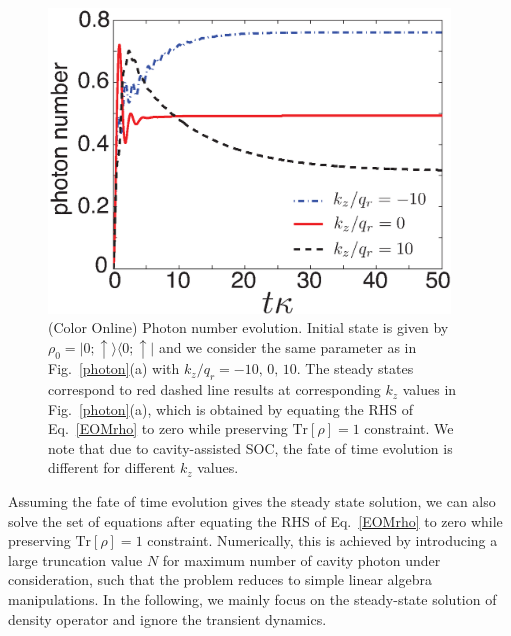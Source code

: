 \documentclass[atoms,article,submit,moreauthors,pdftex,12pt,a4paper]{mdpi}
\begin{document}
\begin{figure}[htp]
\includegraphics[width=0.95\textwidth]{photon_evolution}\caption{(Color Online) Photon number evolution. Initial state is given by $\rho_0=|0;\uparrow\rangle\langle0;\uparrow|$ and we consider the same parameter as in Fig.~\ref{photon}(a) with $k_z/q_r=-10,\,0,\,10$. The steady states correspond to red dashed line results at corresponding $k_z$ values in Fig.~\ref{photon}(a), which is obtained by equating the RHS of Eq.~\ref{EOMrho} to zero while preserving $\text{Tr}[\rho]=1$ constraint. We note that due to cavity-assisted SOC, the fate of time evolution is different for different $k_z$ values.  }\label{evo}
\end{figure}

Assuming the fate of time evolution gives the steady state solution, we can also solve the set of equations after equating the RHS of Eq.~\ref{EOMrho} to zero while preserving $\text{Tr}[\rho]=1$ constraint. Numerically, this is achieved by introducing a large truncation value $N$ for maximum number of cavity photon under consideration, such that the problem reduces to simple linear algebra manipulations. In the following, we mainly focus on the steady-state solution of density operator and ignore the transient dynamics.
\end{document}
